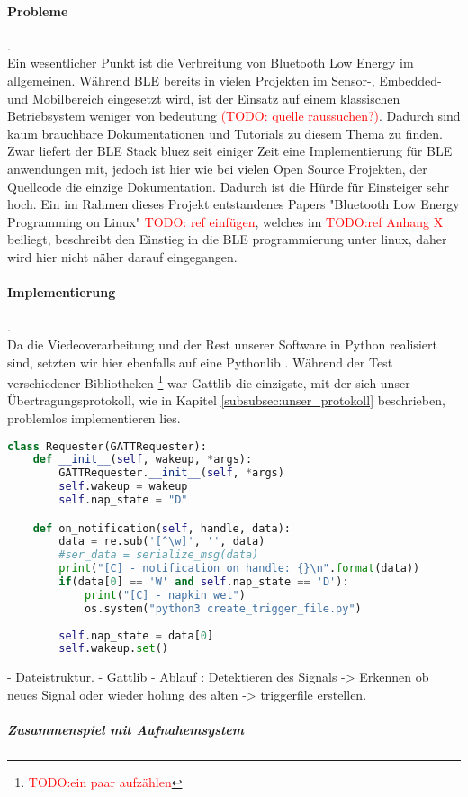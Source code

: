 \paragraph{Probleme}. \\ 
Ein wesentlicher Punkt ist die Verbreitung von Bluetooth Low Energy im allgemeinen. Während BLE bereits in vielen Projekten im Sensor-, Embedded- und Mobilbereich eingesetzt wird, ist der Einsatz auf einem klassischen Betriebsystem weniger von bedeutung \textcolor{red}{(TODO: quelle raussuchen?)}. Dadurch sind kaum brauchbare Dokumentationen und Tutorials zu diesem Thema zu finden. Zwar liefert der BLE Stack bluez seit einiger Zeit eine Implementierung für BLE anwendungen mit, jedoch ist hier wie bei vielen Open Source Projekten, der Quellcode die einzige Dokumentation. Dadurch ist die Hürde für Einsteiger sehr hoch. Ein im Rahmen dieses Projekt entstandenes Papers "Bluetooth Low Energy Programming on Linux"  \textcolor{red}{TODO: ref einfügen}, welches im  \textcolor{red}{TODO:ref  Anhang X} beiliegt, beschreibt den Einstieg in die BLE programmierung unter linux, daher wird hier nicht näher darauf eingegangen. 

\paragraph{Implementierung}. \\

Da die Viedeoverarbeitung und der Rest unserer Software in Python realisiert sind, setzten wir hier ebenfalls auf eine Pythonlib . Während der Test verschiedener Bibliotheken \footnote{\textcolor{red}{TODO:ein paar aufzählen}} war Gattlib die einzigste, mit der sich unser Übertragungsprotokoll, wie in Kapitel \ref{subsubsec:unser_protokoll} beschrieben, problemlos implementieren lies. 

\begin{lstlisting}[language=Python, caption=Requester Class zur Verarbeitung der einkommenden Daten ]
class Requester(GATTRequester):
    def __init__(self, wakeup, *args):
        GATTRequester.__init__(self, *args)
        self.wakeup = wakeup
        self.nap_state = "D"

    def on_notification(self, handle, data):
        data = re.sub('[^\w]', '', data)
        #ser_data = serialize_msg(data)
        print("[C] - notification on handle: {}\n".format(data))
        if(data[0] == 'W' and self.nap_state == 'D'):
            print("[C] - napkin wet")
            os.system("python3 create_trigger_file.py")
            
        self.nap_state = data[0]
        self.wakeup.set()
\end{lstlisting}
\label{lst:eval_com_gattlib}

- Dateistruktur.
- Gattlib
- Ablauf : Detektieren des Signals -> Erkennen ob neues Signal oder wieder holung des alten
  -> triggerfile erstellen.
  


\subparagraph{Zusammenspiel mit Aufnahemsystem}
